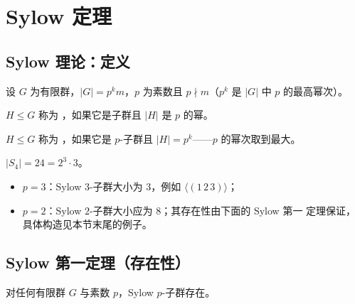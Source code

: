 \section{Sylow 定理}\label{sec:sylow}

\subsection{Sylow 理论：定义}

设 $G$ 为有限群，$|G| = p^k m$，$p$ 为素数且 $p\nmid m$（$p^k$ 是 $|G|$
中 $p$ 的最高幂次）。

\begin{definition}[$p$-子群]
$H\le G$ 称为 ，如果它是子群且 $|H|$ 是 $p$ 的幂。
\end{definition}

\begin{definition}[Sylow $p$-子群]
$H\le G$ 称为 ，如果它是 $p$-子群且
$|H| = p^k$——$p$ 的幂次取到最大。
\end{definition}

\begin{example}[$G = S_4$]
$|S_4| = 24 = 2^3\cdot 3$。
\begin{itemize}[leftmargin=1.3em,itemsep=1pt]
  \item $p=3$：Sylow $3$-子群大小为 $3$，例如 $\langle(1\,2\,3)\rangle$；
  \item $p=2$：Sylow $2$-子群大小应为 $8$；其存在性由下面的 Sylow 第一
        定理保证，具体构造见本节末尾的例子。
\end{itemize}
\end{example}

\subsection{Sylow 第一定理（存在性）}

\begin{theorem}
对任何有限群 $G$ 与素数 $p$，Sylow $p$-子群存在。
\end{theorem}


